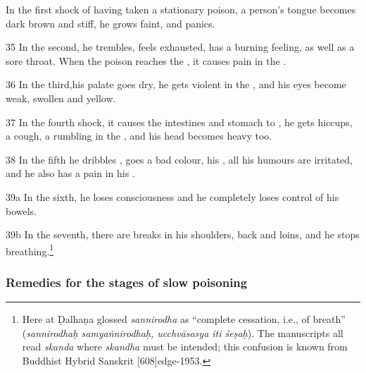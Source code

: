 \begin{translation}
    In the first shock of having taken a stationary poison, a person's tongue becomes dark brown and stiff, he grows faint, and panics.
    
    
    
    \item[35]
    In the second, he trembles, feels exhausted, has a burning feeling, as well as a
    sore throat.  When the poison reaches the , it causes
    pain in the .
    
    
    
    \item[36]
    In the third,his palate goes dry, he gets violent  in the 
    , and his eyes become weak, swollen and yellow.

    \item[37]
    In the fourth shock, it causes the intestines and stomach to
    , he gets hiccups, a cough,  a rumbling in the
    , and his head becomes heavy too.
    
     \item[38]
    In the fifth he dribbles , goes a bad colour,
    his ,  all his humours are irritated, and he
    also has a pain in his .
   
   
    \item[39a]
    In the sixth, he loses consciousness and he completely loses
    control of his bowels.
    
    \item[39b]
    In the seventh, there are breaks in his shoulders, back and loins, and he  
stops breathing.\footnote{%
Here at  Ḍalhaṇa glossed \emph{sannirodha} as
“complete cessation, i.e., of breath” (\emph{sannirodhaḥ 
samyaṅnirodhaḥ, ucchvāsasya iti śeṣaḥ}).
The manuscripts all read \emph{skanda} where \emph{skandha} must be 
intended; this confusion is known from Buddhist Hybrid Sanskrit 
[608]{edge-1953}.}
    
    
    
    \subsubsection{Remedies for the stages of slow poisoning}
  \label{dusivisa}
  

\end{translation}
